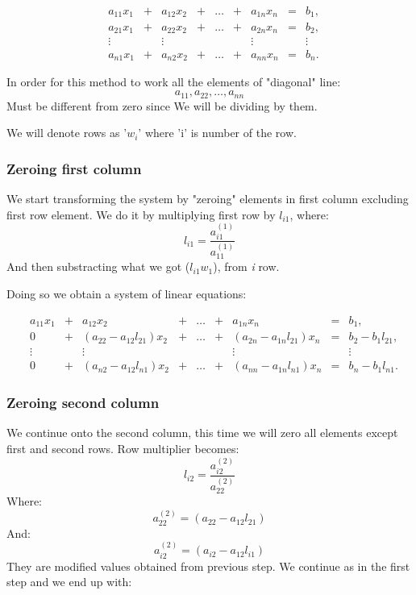 \documentclass[12pt]{report}
\begin{document}
\[
\begin{matrix}

&a_{11}x_1 &{}+&a_{12}x_2&+&\dots&+&a_{1n}x_n &=&b_1,\\

&a_{21}x_1 &{}+&a_{22}x_2&+&\dots&+&a_{2n}x_n &=&b_2,\\

&\vdots    &&\vdots      & &     & &  \vdots  & &\vdots\\

&a_{n1}x_1&{}+&a_{n2}x_2&+&\dots &+&a_{nn}x_n&=&b_n.

\end{matrix}
\]

In order for this method to work all the elements of "diagonal" line:
\[ a_{11}, a_{22}, \dots, a_{nn} \]
Must be different from zero since We will be dividing by them.

We will denote rows as '$w_i$' where 'i' is number of the row.

\subsubsection{Zeroing first column}
We start transforming the system by "zeroing" elements in first column excluding first row element. We do it by multiplying first row by $l_{i1}$, where:
\[ l_{i1} = \frac{ a_{i1}^{(1)} }
{ a_{11}^{(1)} }  \]
And then substracting what we got ($ l_{i1}w_1 $), from \textit{i} row.

Doing so we obtain a system of linear equations:

\[
\begin{matrix}

&a_{11}x_1 &{}+&a_{12}x_2&+&\dots&+&a_{1n}x_n &=&b_1,\\

&0 &{}+&(a_{22} - a_{12}l_{21})x_2&{}+&\dots&{}+&(a_{2n} - a_{1n}l_{21})x_n &=&b_2 - b_{1}l_{21},\\

&\vdots    &&\vdots      & &     & &  \vdots  & &\vdots\\

&0&{}+&(a_{n2} - a_{12}l_{n1})x_2&+&\dots &+&(a_{nn} - a_{1n}l_{n1})x_n&=&b_n - b_{1}l_{n1}.

\end{matrix}
\]

\subsubsection{Zeroing second column}
We continue onto the second column, this time we will zero all elements except first and second rows.
Row multiplier becomes:
\[ l_{i2} = \frac{ a_{i2}^{(2)} }{ a_{22}^{(2)} } \]
Where:
\[ a_{22}^{(2)} = (a_{22} - a_{12}l_{21}) \]
And:
\[ a_{i2}^{(2)} = (a_{i2} - a_{12}l_{i1}) \]
\newpage
They are modified values obtained from previous step.
We continue as in the first step and we end up with:
\end{document}
